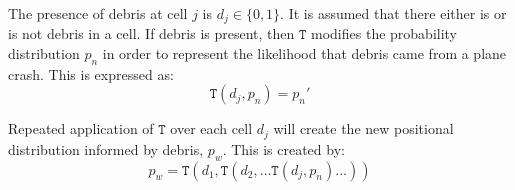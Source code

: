 \documentclass[a4paper,twocolumns]{article}
\begin{document}
\begin{multicols}{2}
The presence of debris at cell $j$ is $d_j\in \{0,1\}$. It is assumed that there either is or is not debris in a cell. If debris is present, then $\mathtt{T}$ modifies the probability distribution $p_n$ in order to represent the likelihood that debris came from a plane crash. This is expressed as: $$\mathtt{T}(d_j,p_n)=p_n'$$

Repeated application of $\mathtt{T}$ over each cell $d_j$ will create the new positional distribution informed by debris, $p_w$. This is created by: $$p_w=\mathtt{T}(d_1, \mathtt{T}(d_2, \ldots \mathtt{T}(d_j, p_n)\ldots))$$

\end{multicols}
\end{document}
